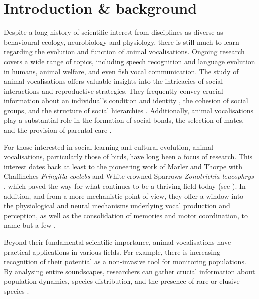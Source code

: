 \section{Introduction \& background}
Despite a long history of scientific interest from disciplines as diverse as behavioural ecology, neurobiology and physiology, there is still much to learn regarding the evolution and function of animal vocalisations. Ongoing research covers a wide range of topics, including speech recognition and language evolution in humans, animal welfare, and even fish vocal communication. The study of animal vocalisations offers valuable insights into the intricacies of social interactions and reproductive strategies. They frequently convey crucial information about an individual's condition and identity \parencite{lehmann2017, linhart2019}, the cohesion of social groups, and the structure of social hierarchies \parencite{bell2010, engesser2022, radford2007}. Additionally, animal vocalisations play a substantial role in the formation of social bonds, the selection of mates, and the provision of parental care \parencite{behr2004, gerhardt1991, pitcher2010, roulin2001}.

For those interested in social learning and cultural evolution, animal vocalisations, particularly those of birds, have long been a focus of research. This interest dates back at least to the pioneering work of Marler and Thorpe with Chaffinches \textit{Fringilla coelebs} and White-crowned Sparrows \textit{Zonotrichia leucophrys} \parencite{marler1964, Marler1962, marler1952, thorpe1958}, which paved the way for what continues to be a thriving field today (see \cite{mets2019, riebel2015, williams2021, youngblood2022}). In addition, and from a more mechanistic point of view, they offer a window into the physiological and neural mechanisms underlying vocal production and perception, as well as the consolidation of memories and motor coordination, to name but a few \parencite{davenport2023}. 

Beyond their fundamental scientific importance, animal vocalisations have practical applications in various fields. For example, there is increasing recognition of their potential as a non-invasive tool for monitoring populations. By analysing entire soundscapes, researchers can gather crucial information about population dynamics, species distribution, and the presence of rare or elusive species \parencite{kahl2021, sethi2020, sugai2019}.

